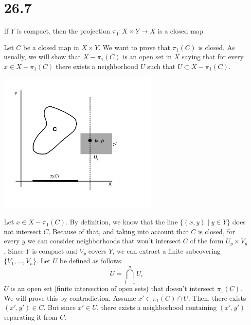 \documentclass{article}
\begin{document}
    \section*{26.7}
    \begin{tcolorbox}[title=Statement]
        If $Y$ is compact, then the projection $\pi_1\colon X \times Y \to X$ is a closed map.
    \end{tcolorbox}
    \noindent
    Let $C$ be a closed map in $X \times Y$. We want to prove that $\pi_1(C)$ is closed. As usually, we will show that $X - \pi_1(C)$ is an open set in $X$ saying that for every $x \in X - \pi_1(C)$ there exists a neighborhood $U$ such that $U \subset X - \pi_1(C)$. 
    \begin{center}
        \includegraphics[width=0.6\textwidth]{diagram1.png}
    \end{center}
    Let $x \in X - \pi_1(C)$. By definition, we know that the line $\{(x, y) \mid y \in Y\}$ does not intersect $C$. Because of that, and taking into account that $C$ is closed, for every $y$ we can consider neighborhoods that won't intersect $C$ of the form $U_y \times V_y$. Since $Y$ is compact and $V_y$ covers $Y$, we can extract a finite subcovering $\{V_1, ..., V_n\}$. Let $U$ be defined as follows:
    \begin{equation*}
        U = \bigcap_{i=1}^{n}{U_i}
    \end{equation*}
    $U$ is an open set (finite intersection of open sets) that doesn't intersect $\pi_1(C)$. We will prove this by contradiction. Assume $x' \in \pi_1(C) \cap U$. Then, there exists $(x', y') \in C$. But since $x' \in U$, there exists a neighborhood containing $(x', y')$ separating it from $C$.
    
\end{document}
